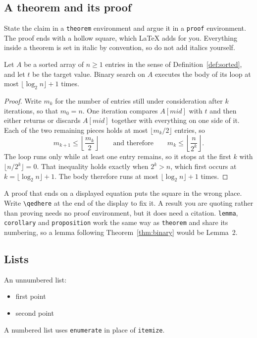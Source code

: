 \subsection*{A theorem and its proof}
State the claim in a \texttt{theorem} environment and argue it in a
\texttt{proof} environment. The proof ends with a hollow square, which LaTeX
adds for you. Everything inside a theorem is set in italic by convention, so
do not add italics yourself.

\begin{theorem}
\label{thm:binary}
Let $A$ be a sorted array of $n \ge 1$ entries in the sense of
Definition~\ref{def:sorted}, and let $t$ be the target value. Binary search on
$A$ executes the body of its loop at most $\lfloor \log_2 n \rfloor + 1$ times.
\end{theorem}

\begin{proof}
Write $m_k$ for the number of entries still under consideration after $k$
iterations, so that $m_0 = n$. One iteration compares $A[mid]$ with $t$ and
then either returns or discards $A[mid]$ together with everything on one side
of it. Each of the two remaining pieces holds at most $\lfloor m_k / 2 \rfloor$
entries, so
\begin{equation}\label{eq:halving}
  m_{k+1} \le \left\lfloor \frac{m_k}{2} \right\rfloor
  \qquad\text{and therefore}\qquad
  m_k \le \left\lfloor \frac{n}{2^k} \right\rfloor .
\end{equation}
The loop runs only while at least one entry remains, so it stops at the first
$k$ with $\lfloor n / 2^k \rfloor = 0$. That inequality holds exactly when
$2^k > n$, which first occurs at $k = \lfloor \log_2 n \rfloor + 1$. The body
therefore runs at most $\lfloor \log_2 n \rfloor + 1$ times.
\end{proof}

A proof that ends on a displayed equation puts the square in the wrong place.
Write \verb|\qedhere| at the end of the display to fix it. A result you are
quoting rather than proving needs no proof environment, but it does need a
citation. \texttt{lemma}, \texttt{corollary} and \texttt{proposition} work the
same way as \texttt{theorem} and share its numbering, so a lemma following
Theorem~\ref{thm:binary} would be Lemma~2.

\subsection*{Lists}
An unnumbered list:
\begin{itemize}
  \item first point
  \item second point
\end{itemize}
A numbered list uses \texttt{enumerate} in place of \texttt{itemize}.

